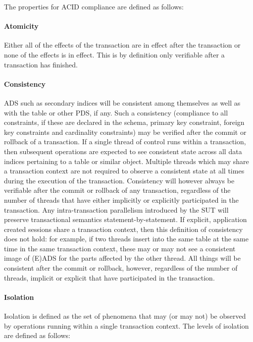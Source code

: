 The properties for ACID compliance are defined as follows:


\paragraph{Atomicity}
Either all of the effects of the transaction are in effect after the transaction or none of the effects
is in effect. This is by definition only verifiable after a transaction has finished.

\paragraph{Consistency}
ADS such as secondary indices will be consistent among themselves as well as with the table or other PDS, if any. Such a consistency (compliance to all constraints, if these are declared in the schema, \eg primary key constraint, foreign key constraints and cardinality constraints) may be verified
after the commit or rollback of a transaction. If a single thread of control runs within a transaction, then
subsequent operations are expected to see consistent state across all data indices pertaining to a table
or similar object. Multiple threads which may share a transaction context are not required to observe a
consistent state at all times during the execution of the transaction. Consistency will however always be
verifiable after the commit or rollback of any transaction, regardless of the number of threads that have
either implicitly or explicitly participated in the transaction. Any intra-transaction parallelism introduced
by the SUT will preserve transactional semantics statement-by-statement. If explicit, application created
sessions share a transaction context, then this definition of consistency does not hold: for example, if
two threads insert into the same table at the same time in the same transaction context, these may or may
not see a consistent image of (E)ADS for the parts affected by the other thread. All things will be
consistent after the commit or rollback, however, regardless of the number of threads, implicit or explicit
that have participated in the transaction.

\paragraph{Isolation}
Isolation is defined as the set of phenomena that may (or may not) be observed by operations running within a single transaction context. The levels of isolation are defined as follows:

